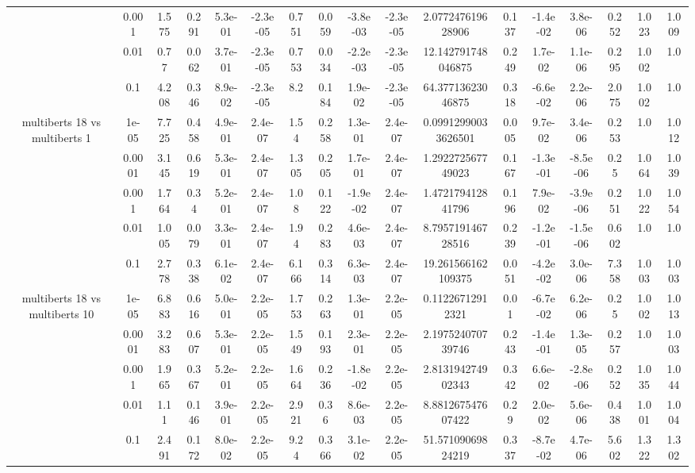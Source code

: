 \begin{tabular}{|c|c|c|c|c|c|c|c|c|c|c|c|c|c|c|c|c|}
 & 0.001 & 1.575 & 0.291 & 5.3e-01 & -2.3e-05 & 0.751 & 0.059 & -3.8e-03 & -2.3e-05 & 2.077247619628906 & 0.137 & -1.4e-02 & 3.8e-06 & 0.252 & 1.023 & 1.009 \\
 & 0.01 & 0.77 & 0.062 & 3.7e-01 & -2.3e-05 & 0.753 & 0.034 & -2.2e-03 & -2.3e-05 & 12.142791748046875 & 0.249 & 1.7e-02 & 1.1e-06 & 0.295 & 1.002 & 1.0 \\
 & 0.1 & 4.208 & 0.346 & 8.9e-02 & -2.3e-05 & 8.2 & 0.184 & 1.9e-02 & -2.3e-05 & 64.37713623046875 & 0.318 & -6.6e-02 & 2.2e-06 & 2.075 & 1.002 & 1.0 \\
\hline
\multirow{5}{*}{multiberts 18 vs multiberts 1} & 1e-05 & 7.725 & 0.458 & 4.9e-01 & 2.4e-07 & 1.54 & 0.258 & 1.3e-01 & 2.4e-07 & 0.09912990033626501 & 0.005 & 9.7e-02 & 3.4e-06 & 0.253 & 1.0 & 1.012 \\
 & 0.0001 & 3.145 & 0.619 & 5.3e-01 & 2.4e-07 & 1.305 & 0.205 & 1.7e-01 & 2.4e-07 & 1.292272567749023 & 0.167 & -1.3e-01 & -8.5e-06 & 0.25 & 1.064 & 1.039 \\
 & 0.001 & 1.764 & 0.34 & 5.2e-01 & 2.4e-07 & 1.08 & 0.122 & -1.9e-02 & 2.4e-07 & 1.472179412841796 & 0.196 & 7.9e-02 & -3.9e-06 & 0.251 & 1.022 & 1.054 \\
 & 0.01 & 1.005 & 0.079 & 3.3e-01 & 2.4e-07 & 1.94 & 0.283 & 4.6e-03 & 2.4e-07 & 8.795719146728516 & 0.239 & -1.2e-01 & -1.5e-06 & 0.602 & 1.0 & 1.0 \\
 & 0.1 & 2.778 & 0.338 & 6.1e-02 & 2.4e-07 & 6.166 & 0.314 & 6.3e-03 & 2.4e-07 & 19.261566162109375 & 0.051 & -4.2e-02 & 3.0e-06 & 7.358 & 1.003 & 1.003 \\
\hline
\multirow{5}{*}{multiberts 18 vs multiberts 10} & 1e-05 & 6.883 & 0.616 & 5.0e-01 & 2.2e-05 & 1.753 & 0.263 & 1.3e-01 & 2.2e-05 & 0.11226712912321 & 0.01 & -6.7e-02 & 6.2e-06 & 0.25 & 1.002 & 1.013 \\
 & 0.0001 & 3.283 & 0.607 & 5.3e-01 & 2.2e-05 & 1.549 & 0.193 & 2.3e-01 & 2.2e-05 & 2.197524070739746 & 0.243 & -1.4e-01 & 1.3e-05 & 0.257 & 1.0 & 1.003 \\
 & 0.001 & 1.965 & 0.367 & 5.2e-01 & 2.2e-05 & 1.664 & 0.236 & -1.8e-02 & 2.2e-05 & 2.813194274902343 & 0.342 & 6.6e-02 & -2.8e-06 & 0.252 & 1.035 & 1.044 \\
 & 0.01 & 1.11 & 0.146 & 3.9e-01 & 2.2e-05 & 2.921 & 0.36 & 8.6e-03 & 2.2e-05 & 8.881267547607422 & 0.29 & 2.0e-02 & 5.6e-06 & 0.438 & 1.001 & 1.004 \\
 & 0.1 & 2.491 & 0.172 & 8.0e-02 & 2.2e-05 & 9.24 & 0.366 & 3.1e-02 & 2.2e-05 & 51.57109069824219 & 0.337 & -8.7e-02 & 4.7e-06 & 5.602 & 1.322 & 1.302 \\

\end{tabular}
